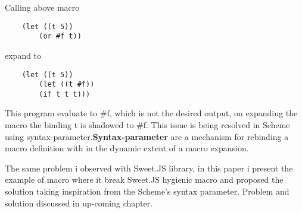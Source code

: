 Calling above macro 
\begin{lstlisting}
 	(let ((t 5))
  		(or #f t))
\end{lstlisting} 
  expand to 

\begin{lstlisting} 
  	(let ((t 5))
  		(let ((t #f))
    	(if t t t)))
\end{lstlisting} 
    
    This program evaluate to \#f, which is not the desired output, on expanding the macro the binding t is shadowed to \#f. This issue is being resolved in Scheme using syntax-parameter.\textbf{Syntax-parameter} are a mechanism for rebinding a macro definition with in the dynamic extent of a macro expansion.

The same problem i observed with Sweet.JS library, in this paper i present the example of macro where it break Sweet.JS hygienic macro and proposed the solution taking inspiration from the Scheme's syntax parameter. Problem and solution discussed in up-coming chapter.